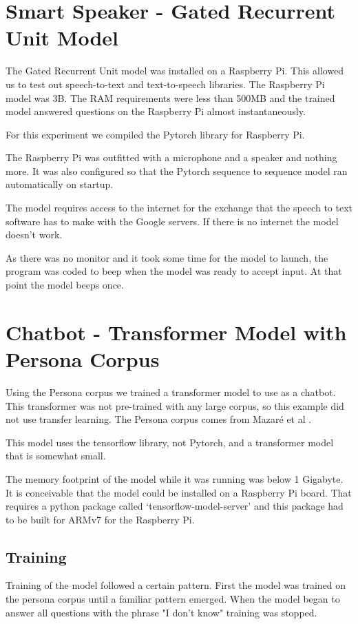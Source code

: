 \section{Smart Speaker - Gated Recurrent Unit Model}

The Gated Recurrent Unit model was installed on a Raspberry Pi. This allowed us to test out speech-to-text and text-to-speech libraries. The Raspberry Pi model was 3B. The RAM requirements were less than 500MB and the trained model answered questions on the Raspberry Pi almost instantaneously.

For this experiment we compiled the Pytorch library for Raspberry Pi.

The Raspberry Pi was outfitted with a microphone and a speaker and nothing more. It was also configured so that the Pytorch sequence to sequence model ran automatically on startup.

The model requires access to the internet for the exchange that the speech to text software has to make with the Google servers. If there is no internet the model doesn't work.

As there was no monitor and it took some time for the model to launch, the program was coded to beep when the model was ready to accept input. At that point the model beeps once.

\section{Chatbot - Transformer Model with Persona Corpus}
Using the Persona corpus we trained a transformer model to use as a chatbot. This transformer was not pre-trained with any large corpus, so this example did not use transfer learning. The Persona corpus comes from Mazar{\'{e}} et al \cite{DBLP:journals/corr/abs-1809-01984}.

This model uses the tensorflow library, not Pytorch, and a transformer model that is somewhat small.

The memory footprint of the model while it was running was below 1 Gigabyte. It is conceivable that the model could be installed on a Raspberry Pi board. That requires a python package called `tensorflow-model-server' and this package had to be built for ARMv7 for the Raspberry Pi. 

\subsection{Training}
Training of the model followed a certain pattern. First the model was trained on the persona corpus until a familiar pattern emerged. When the model began to answer all questions with the 
phrase "I don't know" training was stopped. 

